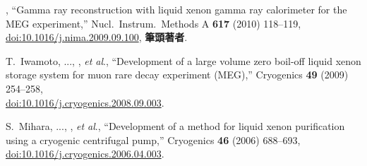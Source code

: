\begin{enumerate}
\me, ``Gamma ray reconstruction with liquid xenon gamma ray calorimeter for the MEG experiment,''
Nucl.\ Instrum.\ Methods A \textbf{617} (2010) 118--119,
\href{https://doi.org/10.1016/j.nima.2009.09.100}{doi:10.1016/j.nima.2009.09.100},
\textbf{筆頭著者}.

T.~Iwamoto, ..., \me,  {\it et al}.,  %
``Development of a large volume zero boil-off liquid xenon storage system for muon rare decay experiment (MEG),''
Cryogenics \textbf{49} (2009) 254--258,\\
\href{https://doi.org/10.1016/j.cryogenics.2008.09.003}{doi:10.1016/j.cryogenics.2008.09.003}.

S.~Mihara, ..., \me,  {\it et al}., %
``Development of a method for liquid xenon purification using a cryogenic centrifugal pump,''
Cryogenics \textbf{46} (2006) 688--693,
\href{https://doi.org/10.1016/j.cryogenics.2006.04.003}{doi:10.1016/j.cryogenics.2006.04.003}.

\end{enumerate}



